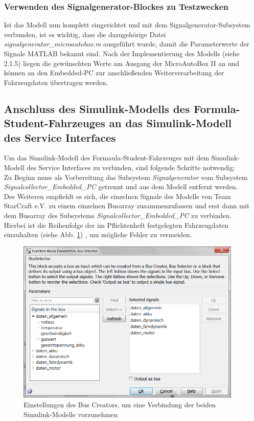 \documentclass[fontsize = 12pt, paper = a4]{scrreprt}
\begin{document}
\subsubsection{Verwenden des Signalgenerator-Blockes zu Testzwecken}

Ist das Modell nun komplett eingerichtet und mit dem Signalgenerator-Subsystem verbunden, ist es wichtig, dass die dazugehörige Datei \textit{signalgenerator\_microautobox.m} ausgeführt wurde, damit die Parameterwerte der Signale MATLAB bekannt sind. Nach der Implementierung des Modells (siehe 2.1.5) liegen die gewünschten Werte am Ausgang der MicroAutoBox II an und können an den Embedded-PC zur anschließenden Weiterverarbeitung der Fahrzeugdaten übertragen werden.




\subsection{Anschluss des Simulink-Modells des Formula-Student-Fahrzeuges an das Simulink-Modell des Service Interfaces}

Um das Simulink-Modell des Formaula-Student-Fahrzeuges mit dem Simulink-Modell des Service Interfaces zu verbinden, sind folgende Schritte notwendig: \\

Zu Beginn muss als Vorbereitung das Subsystem \textit{Signalgenerator} vom Subsystem \textit{Signalcollector\_Embedded\_PC} getrennt und aus dem Modell entfernt werden. Des Weiteren empfiehlt es sich, die einzelnen Signale des Modells von Team StarCraft e.V. zu einem einzelnen Busarray zusammenzufassen und erst dann mit dem Busarray des Subsystems \textit{Signalcollector\_Embedded\_PC} zu verbinden.
Hierbei ist die Reihenfolge der im Pflichtenheft festgelegten Fahrzeugdaten einzuhalten (siehe Abb. \ref{anschlussbus}) , um mögliche Fehler zu vermeiden. 

\begin{figure}[h]
\centering
\includegraphics[scale = 0.45]{anschlussbus}
\caption[Einstellungen des Bus Creators]{Einstellungen des Bus Creators, um eine Verbindung der beiden Simulink-Modelle vorzunehmen}
\label{anschlussbus}
\end{figure} 
\end{document}
